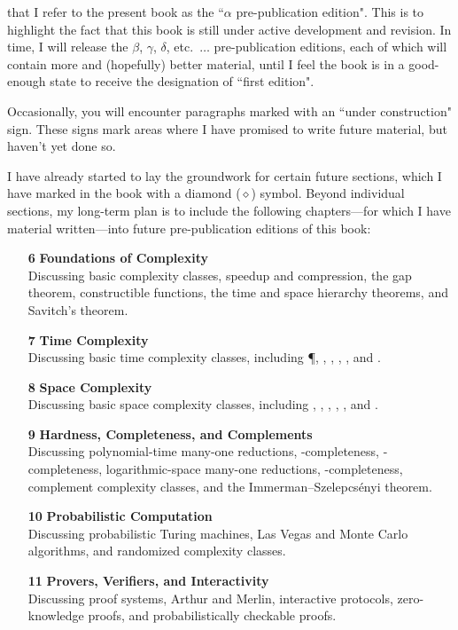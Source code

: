  that I refer to the present book as the ``$\alpha$ pre-publication edition". This is to highlight the fact that this book is still under active development and revision. In time, I will release the $\beta$, $\gamma$, $\delta$, etc.\ $\dots$ pre-publication editions, each of which will contain more and (hopefully) better material, until I feel the book is in a good-enough state to receive the designation of ``first edition".

\begin{construction}
Occasionally, you will encounter paragraphs marked with an ``under construction" sign. These signs mark areas where I have promised to write future material, but haven't yet done so.
\end{construction}

I have already started to lay the groundwork for certain future sections, which I have marked in the book with a diamond ($\diamond$) symbol. Beyond individual sections, my long-term plan is to include the following chapters---for which I have material written---into future pre-publication editions of this book:
\begin{enumerate}
\item[\textbf{6}] \textbf{Foundations of Complexity} \\
Discussing basic complexity classes, speedup and compression, the gap theorem, constructible functions, the time and space hierarchy theorems, and Savitch's theorem.
\item[\textbf{7}] \textbf{Time Complexity} \\
Discussing basic time complexity classes, including \P, \NP, \E, \NE, \EXP, and \NEXP.
\item[\textbf{8}] \textbf{Space Complexity} \\
Discussing basic space complexity classes, including \cL, \NL, \PSPACE, \NPSPACE, \EXPSPACE, and \NEXPSPACE.
\item[\textbf{9}] \textbf{Hardness, Completeness, and Complements} \\
Discussing polynomial-time many-one reductions, \NP-completeness, \PSPACE-completeness, logarithmic-space many-one reductions, \NL-completeness, complement complexity classes, and the Immerman--Szelepcs\'{e}nyi theorem.
\item[\textbf{10}] \textbf{Probabilistic Computation} \\
Discussing probabilistic Turing machines, Las Vegas and Monte Carlo algorithms, and randomized complexity classes.
\item[\textbf{11}] \textbf{Provers, Verifiers, and Interactivity} \\
Discussing proof systems, Arthur and Merlin, interactive protocols, zero-knowledge proofs, and probabilistically checkable proofs.
\end{enumerate}
